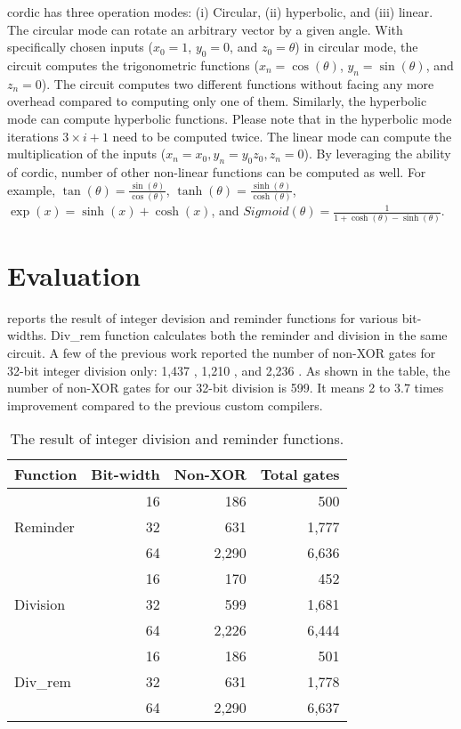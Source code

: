 \acrshort{cordic} has three operation modes:
(i) Circular, (ii) hyperbolic, and (iii) linear.
The circular mode can rotate an arbitrary vector by a given angle.
With specifically chosen inputs ($x_0=1$, $y_0=0$, and $z_0=\theta$) in circular mode, the circuit computes the trigonometric functions ($x_n=\cos(\theta)$, $y_n=\sin(\theta)$, and $z_n=0$).
The circuit computes two different functions without facing any more overhead compared to computing only one of them.
Similarly, the hyperbolic mode can compute hyperbolic functions.
Please note that in the hyperbolic mode iterations $3\times i+1$ need to be computed twice.
The linear mode can compute the multiplication of the inputs ($x_n=x_0, y_n=y_0z_0, z_n=0$).
By leveraging the ability of \acrshort{cordic}, number of other non-linear functions can be computed as well.
For example,
$\tan(\theta)=\frac{\sin(\theta)}{\cos(\theta)}$,
$\tanh(\theta)=\frac{\sinh(\theta)}{\cosh(\theta)}$,
$\exp(x)=\sinh (x) + \cosh (x)$, and
$Sigmoid(\theta)=\frac{1}{1+\cosh(\theta)-\sinh(\theta)}$.

\section{Evaluation}
 reports the result of integer devision and reminder functions for various bit-widths.
Div\_rem function calculates both the reminder and division in the same circuit.
A few of the previous work reported the number of non-XOR gates for 32-bit integer division only: 1,437 \cite{mood2016frigate}, 1,210 \cite{zahur2015obliv}, and 2,236 \cite{liu2015oblivm}.
As shown in the table, the number of non-XOR gates for our 32-bit division is 599.
It means 2 to 3.7 times improvement compared to the previous custom compilers.

\begin{table}
\center
\caption{The result of integer division and reminder functions.}\label{table:div}
\begin{tabular}{l||r||r|r}
	Function                  & \multicolumn{1}{c|}{Bit-width} & \multicolumn{1}{c|}{Non-XOR} & \multicolumn{1}{c}{Total gates} \\ \hline \hline
\multirow{3}{*}{Reminder} & 16        & 186     & 500         \\
                          & 32        & 631     & 1,777       \\
                          & 64        & 2,290   & 6,636       \\ \hline \hline
\multirow{3}{*}{Division} & 16        & 170     & 452         \\
                          & 32        & 599     & 1,681       \\
                          & 64        & 2,226   & 6,444       \\ \hline \hline
\multirow{3}{*}{Div\_rem} & 16        & 186     & 501         \\
                          & 32        & 631     & 1,778       \\
                          & 64        & 2,290   & 6,637
\end{tabular}
\end{table}

